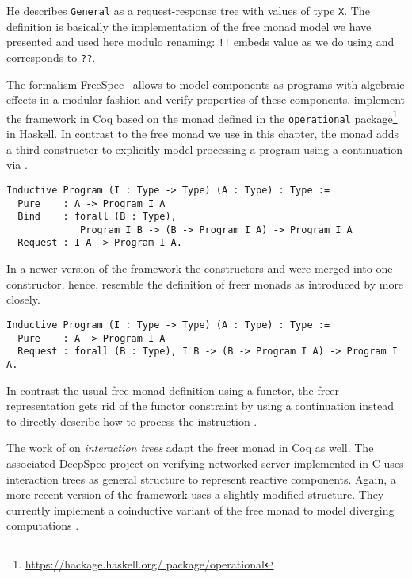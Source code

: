 He describes \texttt{General} as a request-response tree with values
of type \texttt{X}.
The definition is basically the implementation of the free monad model we
have presented and used here modulo renaming: \texttt{!!} embeds
value as we do using  and  corresponds to
\texttt{??}.

The formalism FreeSpec~\citep{letan2018modular} allows to model
components as programs with algebraic effects in a modular fashion
and verify properties of these components.
\citeauthor{letan2018modular} implement the framework in Coq based on
the  monad defined in the \texttt{operational} package\footnote{\url{https://hackage.haskell.org/
    package/operational}} in Haskell.
In contrast to the free monad we use in this chapter, the
 monad adds a third constructor to explicitly model
processing a program using a continuation via .

\begin{verbatim}
Inductive Program (I : Type -> Type) (A : Type) : Type :=
  Pure    : A -> Program I A
  Bind    : forall (B : Type),
             Program I B -> (B -> Program I A) -> Program I A
  Request : I A -> Program I A.
\end{verbatim}

In a newer version of the framework the constructors  and
 were merged into one constructor, hence, resemble the
definition of freer monads as introduced by \citet{kiselyov2015freer}
more closely.

\begin{verbatim}
Inductive Program (I : Type -> Type) (A : Type) : Type :=
  Pure    : A -> Program I A
  Request : forall (B : Type), I B -> (B -> Program I A) -> Program I A.
\end{verbatim}

In contrast the usual free monad definition using a functor, the freer
representation gets rid of the functor constraint by using a
continuation  instead to directly describe how
to process the instruction .

The work of \citet{koh2019interaction} on \emph{interaction trees}
adapt the freer monad in Coq as well.
The associated DeepSpec project on verifying networked server
implemented in C uses interaction trees as general structure to
represent reactive components.
Again,  a more recent version of the framework uses a slightly
modified structure.
They currently implement a coinductive variant of the free monad to
model diverging computations \citep{xia2019interaction}.

